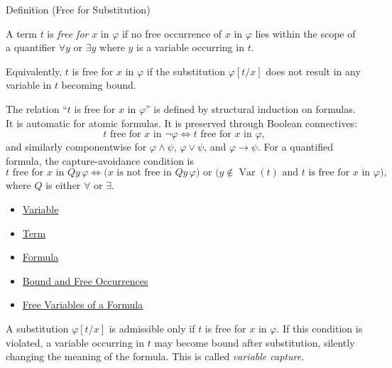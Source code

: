 \begin{definitionbox}{Definition (Free for Substitution)}
\begin{definition}
\label{def:free-for}
A term $t$ is \emph{free for} $x$ in $\varphi$ if no free occurrence of $x$ in
$\varphi$ lies within the scope of a quantifier $\forall y$ or $\exists y$
where $y$ is a variable occurring in $t$.

Equivalently, $t$ is free for $x$ in $\varphi$ if the substitution $\varphi[t/x]$
does not result in any variable in $t$ becoming bound.
\end{definition}
\begin{remark*}
The relation ``$t$ is free for $x$ in $\varphi$'' is defined by structural
induction on formulas. It is automatic for atomic formulas. It is preserved
through Boolean connectives:
\[
  t\text{ free for }x\text{ in }\neg\varphi
  \iff
  t\text{ free for }x\text{ in }\varphi,
\]
and similarly componentwise for $\varphi\land\psi$, $\varphi\lor\psi$, and
$\varphi\to\psi$. For a quantified formula, the capture-avoidance condition is
\[
  t\text{ free for }x\text{ in }Qy\,\varphi
  \iff
  \bigl(x\text{ is not free in }Qy\,\varphi\bigr)
  \text{ or }
  \bigl(y\notin\operatorname{Var}(t)
    \text{ and }t\text{ is free for }x\text{ in }\varphi\bigr),
\]
where $Q$ is either $\forall$ or $\exists$.
\end{remark*}
\begin{dependencies}
\begin{itemize}
  \item \hyperref[def:variable]{Variable}
  \item \hyperref[def:term]{Term}
  \item \hyperref[def:formula]{Formula}
  \item \hyperref[def:bound-free]{Bound and Free Occurrences}
  \item \hyperref[def:fv]{Free Variables of a Formula}
\end{itemize}
\end{dependencies}
\end{definitionbox}

\begin{remark*}
A substitution $\varphi[t/x]$ is admissible only if $t$ is free for $x$ in
$\varphi$. If this condition is violated, a variable occurring in $t$ may
become bound after substitution, silently changing the meaning of the formula.
This is called \emph{variable capture}.
\end{remark*}

